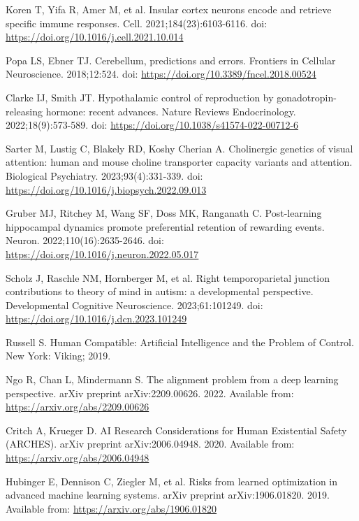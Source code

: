 \documentclass[10pt]{article}
\begin{document}
\begin{thebibliography}{10}
 Koren T, Yifa R, Amer M, et al. Insular cortex neurons encode and retrieve specific immune responses. Cell. 2021;184(23):6103-6116. doi: \url{https://doi.org/10.1016/j.cell.2021.10.014}

 Popa LS, Ebner TJ. Cerebellum, predictions and errors. Frontiers in Cellular Neuroscience. 2018;12:524. doi: \url{https://doi.org/10.3389/fncel.2018.00524}

 Clarke IJ, Smith JT. Hypothalamic control of reproduction by gonadotropin-releasing hormone: recent advances. Nature Reviews Endocrinology. 2022;18(9):573-589. doi: \url{https://doi.org/10.1038/s41574-022-00712-6}

 Sarter M, Lustig C, Blakely RD, Koshy Cherian A. Cholinergic genetics of visual attention: human and mouse choline transporter capacity variants and attention. Biological Psychiatry. 2023;93(4):331-339. doi: \url{https://doi.org/10.1016/j.biopsych.2022.09.013}

 Gruber MJ, Ritchey M, Wang SF, Doss MK, Ranganath C. Post-learning hippocampal dynamics promote preferential retention of rewarding events. Neuron. 2022;110(16):2635-2646. doi: \url{https://doi.org/10.1016/j.neuron.2022.05.017}

 Scholz J, Raschle NM, Hornberger M, et al. Right temporoparietal junction contributions to theory of mind in autism: a developmental perspective. Developmental Cognitive Neuroscience. 2023;61:101249. doi: \url{https://doi.org/10.1016/j.dcn.2023.101249}

 Russell S. Human Compatible: Artificial Intelligence and the Problem of Control. New York: Viking; 2019.

 Ngo R, Chan L, Mindermann S. The alignment problem from a deep learning perspective. arXiv preprint arXiv:2209.00626. 2022. Available from: \url{https://arxiv.org/abs/2209.00626}

 Critch A, Krueger D. AI Research Considerations for Human Existential Safety (ARCHES). arXiv preprint arXiv:2006.04948. 2020. Available from: \url{https://arxiv.org/abs/2006.04948}

 Hubinger E, Dennison C, Ziegler M, et al. Risks from learned optimization in advanced machine learning systems. arXiv preprint arXiv:1906.01820. 2019. Available from: \url{https://arxiv.org/abs/1906.01820}


\end{thebibliography}
\end{document}
